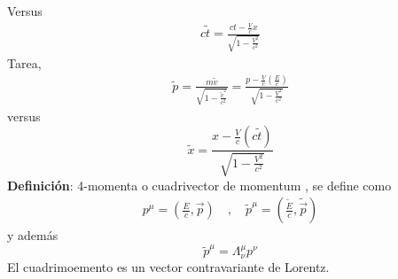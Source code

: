 \documentclass[../main.tex]{subfiles}
\begin{document}
Versus
\begin{align*}
  c\tilde{t} =\frac{ct-\frac{V}{c}x}{\sqrt{1-\frac{V^2}{c^2}}}
\end{align*}
Tarea, 
\begin{align*}
  \tilde{p}=\frac{m\tilde{v}}{\sqrt{1-\frac{\tilde{v}^2}{c^2}}} = \frac{p-\frac{V}{c}\left( \frac{E}{c} \right)}{\sqrt{1-\frac{V^2}{c^2}}}
\end{align*}
versus
\begin{equation*}
  \tilde{x} = \frac{x-\frac{V}{c}(c\tilde{t})}{\sqrt{1-\frac{V^2}{c^2}}}
\end{equation*}
\textbf{Definición}: 4-momenta o cuadrivector de momentum , se define como 
\begin{align}
  p^\mu = \left( \frac{E}{c},\vec{p} \right)\quad , \quad \tilde{p}^\mu = \left(\frac{\tilde{E}}{c}, \tilde{\vec{p}}\right)
\end{align}
y además
\begin{equation}
  \tilde{p}^\mu = \Lambda^\mu_\nu p^\nu
\end{equation}
El cuadrimoemento es un vector contravariante de Lorentz.
\end{document}
